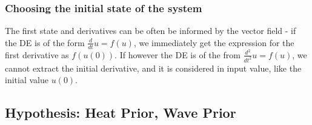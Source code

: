 \subsubsection*{Choosing the initial state of the system}
The first state and derivatives can be often be informed by the vector field - if the DE is of the form $\frac{d}{dt}u = f(u)$, we immediately get the expression for the first derivative as $f(u(0))$. If however the DE is of the from $\frac{d^2}{dt^2}u = f(u)$, we cannot extract the initial derivative, and it is considered in input value, like the initial value $u(0)$.

    
\subsection*{Hypothesis: Heat Prior, Wave Prior}



\ifdefined\COMPILINGFROMMAIN
\else    
    
\fi